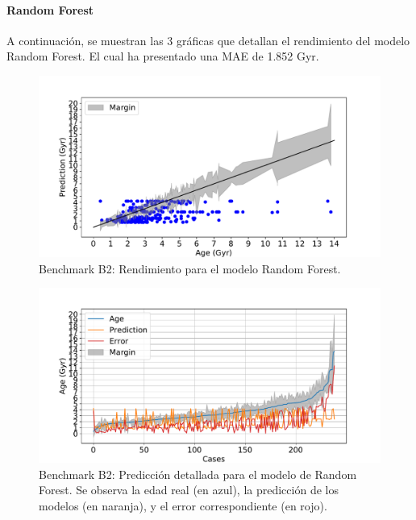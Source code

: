 \paragraph{Random Forest} 
A continuación, se muestran las 3 gráficas que detallan el rendimiento del modelo Random Forest. El cual ha presentado una MAE de 1.852 Gyr.
\begin{figure}[H]
\begin{center}
 \includegraphics[width=0.8\linewidth]{Figuras/Experimentos/B_B2_rf_1.pdf}
\end{center}
\caption{Benchmark B2: Rendimiento para el modelo Random Forest.}
 \label{fig:benchB2_details_rf_1}
\end{figure}

\begin{figure}[H]
\begin{center}
 \includegraphics[width=0.8\linewidth]{Figuras/Experimentos/B_B2_rf_2.pdf}
\end{center}
\caption{Benchmark B2: Predicción detallada para el modelo de Random Forest. Se observa la edad real (en azul), la predicción de los modelos (en naranja), y el error correspondiente (en rojo).}
 \label{fig:benchB2_details_rf_2}
\end{figure}

